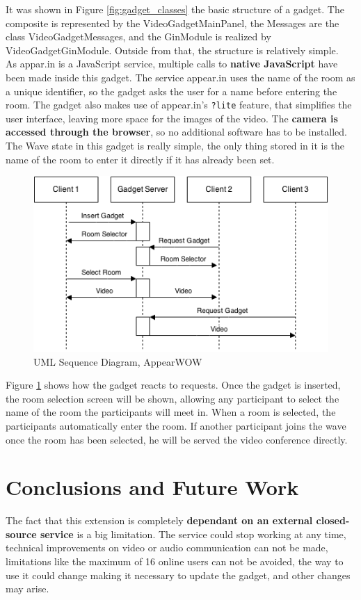 It was shown in Figure \ref{fig:gadget_classes} the basic structure of a gadget. The composite is represented by the VideoGadgetMainPanel, the Messages are the class VideoGadgetMessages, and the GinModule is realized by VideoGadgetGinModule. Outside from that, the structure is relatively simple.\\[.2cm]
As appar.in is a JavaScript service, multiple calls to \textbf{native JavaScript} have been made inside this gadget.
The service appear.in uses the name of the room as a unique identifier, so the gadget asks the user for a name before entering the room. The gadget also makes use of appear.in's \verb|?lite| feature, that simplifies the user interface, leaving more space for the images of the video. The \textbf{camera is accessed through the browser}, so no additional software has to be installed.\\[.2cm]
The Wave state in this gadget is really simple, the only thing stored in it is the name of the room to enter it directly if it has already been set.\\[.2cm]
\begin{figure}[h]
  \center
    \includegraphics[keepaspectratio, scale=0.6]{Media/Diagrams/Gadget/VideoSequence.png}
  \caption{UML Sequence Diagram, AppearWOW}
  \label{fig:video_gadget_sequence}
\end{figure}
Figure \ref{fig:video_gadget_sequence} shows how the gadget reacts to requests. Once the gadget is inserted, the room selection screen will be shown, allowing any participant to select the name of the room the participants will meet in. When a room is selected, the participants automatically enter the room. If another participant joins the wave once the room has been selected, he will be served the video conference directly.
\section{Conclusions and Future Work}
The fact that this extension is completely \textbf{dependant on an external closed-source service} is a big limitation. The service could stop working at any time, technical improvements on video or audio communication can not be made, limitations like the maximum of 16 online users can not be avoided, the way to use it could change making it necessary to update the gadget, and other changes may arise.
\newpage
